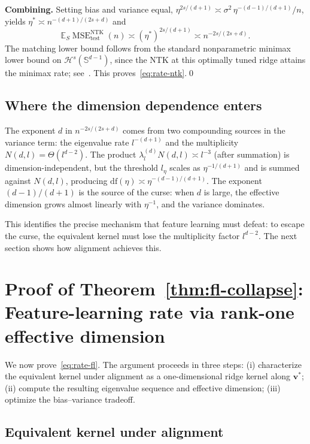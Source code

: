 \documentclass[12pt]{amsart}
\theoremstyle{definition}
\theoremstyle{remark}
\DeclareMathOperator{\MSE}{MSE}
\newcommand{\E}{\mathbb{E}}
\newcommand{\bv}{\mathbf{v}}
\begin{document}
\textbf{Combining.}
Setting bias and variance equal,
$\eta^{2s/(d+1)} \asymp \sigma^{2}\, \eta^{-(d-1)/(d+1)}/n$,
yields $\eta^{*} \asymp n^{-(d+1)/(2s+d)}$ and
\[
  \E_{S} \MSE_{\mathrm{test}}^{\mathrm{NTK}}(n)
  \asymp (\eta^{*})^{2s/(d+1)}
  \asymp n^{-2s/(2s+d)}.
\]
The matching lower bound follows from the standard nonparametric minimax
lower bound on $\mathcal{H}^{s}(\mathbb{S}^{d-1})$, since the NTK at this
optimally tuned ridge attains the minimax rate; see~\cite{RZ2019}. This
proves~\eqref{eq:rate-ntk}.\qed

\subsection{Where the dimension dependence enters}

The exponent $d$ in $n^{-2s/(2s+d)}$ comes from two compounding sources in
the variance term: the eigenvalue rate $l^{-(d+1)}$ and the multiplicity
$N(d,l) = \Theta(l^{d-2})$. The product $\lambda_{l}^{(d)} N(d,l) \asymp l^{-3}$
(after summation) is dimension-independent, but the threshold $l_{\eta}$
scales as $\eta^{-1/(d+1)}$ and is summed against $N(d,l)$, producing
$\mathrm{df}(\eta) \asymp \eta^{-(d-1)/(d+1)}$. The exponent $(d-1)/(d+1)$
is the source of the curse: when $d$ is large, the effective dimension
grows almost linearly with $\eta^{-1}$, and the variance dominates.

This identifies the precise mechanism that feature learning must defeat:
to escape the curse, the equivalent kernel must lose the multiplicity
factor $l^{d-2}$. The next section shows how alignment achieves this.

\section{Proof of Theorem~\ref{thm:fl-collapse}: Feature-learning rate via
  rank-one effective dimension}\label{sec:fl-fl}

We now prove~\eqref{eq:rate-fl}. The argument proceeds in three steps:
(i) characterize the equivalent kernel under alignment as a one-dimensional
ridge kernel along $\bv^{*}$; (ii) compute the resulting eigenvalue
sequence and effective dimension; (iii) optimize the bias--variance
tradeoff.

\subsection{Equivalent kernel under alignment}
\end{document}
